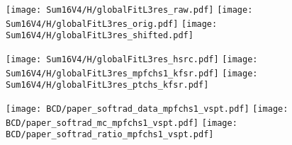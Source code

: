 \documentclass[landscape,10pt]{beamer} %
\newcommand{\commentout}[1]{}
\begin{document}
\newpage

\begin{figure}[p]
\centering
  \texttt{[image: Sum16V4/H/globalFitL3res\_raw.pdf]}
  \texttt{[image: Sum16V4/H/globalFitL3res\_orig.pdf]}
  \texttt{[image: Sum16V4/H/globalFitL3res\_shifted.pdf]}
\end{figure}
\begin{figure}[p]
\centering
  \texttt{[image: Sum16V4/H/globalFitL3res\_hsrc.pdf]}
  \texttt{[image: Sum16V4/H/globalFitL3res\_mpfchs1\_kfsr.pdf]}
  \texttt{[image: Sum16V4/H/globalFitL3res\_ptchs\_kfsr.pdf]}
\end{figure}

\commentout{
\newpage

\begin{figure}[p]
\centering
  \texttt{[image: L4/globalFitL3res\_raw.pdf]}
  \texttt{[image: L4/globalFitL3res\_orig.pdf]}
  \texttt{[image: L4/globalFitL3res\_shifted.pdf]}
\end{figure}
\begin{figure}[p]
\centering
  \texttt{[image: L4/globalFitL3res\_hsrc.pdf]}
  \texttt{[image: L4/globalFitL3res\_mpfchs1\_kfsr.pdf]}
  \texttt{[image: L4/globalFitL3res\_ptchs\_kfsr.pdf]}
\end{figure}
}%

\commentout{
\newpage

\begin{figure}[p]
\centering
\texttt{[image: drawBCDEFvsGH\_mpfchs1\_ptchs.pdf]}
\texttt{[image: drawEFvsBCD\_mpfchs1\_ptchs.pdf]}
\texttt{[image: drawHvsG\_mpfchs1\_ptchs.pdf]}\\
\texttt{[image: drawBCDEFvsGH\_mpfchs1\_ptchs\_nogjmpf\_mjvsjes.pdf]}
\texttt{[image: drawEFvsBCD\_mpfchs1\_ptchs\_nogjmpf.pdf]}
\texttt{[image: drawHvsG\_mpfchs1\_ptchs\_nogjmpf.pdf]}
\end{figure}
} %

\newpage

\begin{figure}[p]
\centering
  \texttt{[image: BCD/paper\_softrad\_data\_mpfchs1\_vspt.pdf]}
  \texttt{[image: BCD/paper\_softrad\_mc\_mpfchs1\_vspt.pdf]}
  \texttt{[image: BCD/paper\_softrad\_ratio\_mpfchs1\_vspt.pdf]}
\end{figure}
\end{document}
